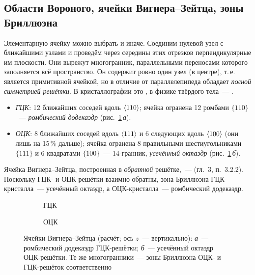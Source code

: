 \subsection{Области Вороного, ячейки Вигнера--Зейтца, зоны Бриллюэна}\label{ssec:wigner}

Элементарную ячейку можно выбрать и иначе. Соединим нулевой узел с
ближайшими узлами и проведём через середины этих отрезков
перпендикулярные им плоскости. Они вырежут многогранник, параллельными
переносами которого заполняется всё пространство. Он содержит ровно
один узел (в центре), т.\,е. является примитивной ячейкой, но в отличие от
параллелепипеда обладает \emph{полной симметрией решётки}. В
кристаллографии это , в физике твёрдого
тела~— .

\begin{itemize}
\item \emph{ГЦК}: 12 ближайших соседей вдоль $\langle 110\rangle$; ячейка огранена 12
ромбами $\{110\}$~— \emph{ромбический додекаэдр} (рис.~\ref{fig:wigner}\,\textit{а}).
\item \emph{ОЦК}: 8 ближайших соседей вдоль $\langle 111\rangle$ и 6 следующих вдоль
$\langle 100\rangle$ (они лишь на 15\,\% дальше); ячейка огранена 8 правильными
шестиугольниками $\{111\}$ и 6 квадратами $\{100\}$~— 14-гранник,
\emph{усечённый октаэдр} (рис.~\ref{fig:wigner}\,\textit{б}).
\end{itemize}

Ячейка Вигнера--Зейтца, построенная в \emph{обратной} решётке,~—
 (гл.~3, п.~3.2.2). Поскольку ГЦК- и
ОЦК-решётки взаимно обратны, зона Бриллюэна ГЦК-кристалла~— усечённый
октаэдр, а ОЦК-кристалла~— ромбический додекаэдр.

\begin{figure}[ht]
\centering
{}
\begin{subfigure}[b]{0.4\textwidth}\centering
\begin{tikzpicture}[scale=1.6]
  
\end{tikzpicture}
\caption{ГЦК}
\end{subfigure}\hspace{8mm}
\begin{subfigure}[b]{0.4\textwidth}\centering
\begin{tikzpicture}[scale=1.6]
  
\end{tikzpicture}
\caption{ОЦК}
\end{subfigure}
\caption{Ячейки Вигнера--Зейтца (расчёт; ось $z$~— вертикально):
\textit{а}~— ромбический додекаэдр ГЦК-решётки; \textit{б}~— усечённый
октаэдр ОЦК-решётки. Те же многогранники~— зоны Бриллюэна ОЦК- и
ГЦК-решёток соответственно}
\label{fig:wigner}
\end{figure}

